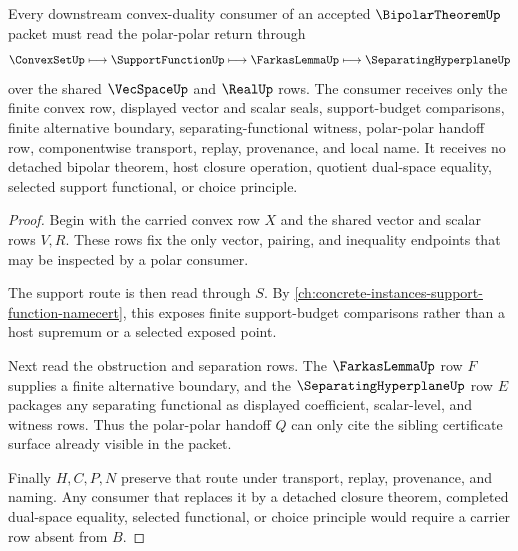 \begin{theorem}
\label{thm:bipolar-theorem-polar-handoff}
Every downstream convex-duality consumer of an accepted $\BipolarTheoremUp$ packet must read the polar-polar return through
$$
\ConvexSetUp \longmapsto \SupportFunctionUp \longmapsto \FarkasLemmaUp \longmapsto \SeparatingHyperplaneUp
$$
over the shared $\VecSpaceUp$ and $\RealUp$ rows. The consumer receives only the finite convex row, displayed vector and scalar seals, support-budget comparisons, finite alternative boundary, separating-functional witness, polar-polar handoff row, componentwise transport, replay, provenance, and local name. It receives no detached bipolar theorem, host closure operation, quotient dual-space equality, selected support functional, or choice principle.
\end{theorem}
\begin{proof}
Begin with the carried convex row $X$ and the shared vector and scalar rows $V,R$. These rows fix the only vector, pairing, and inequality endpoints that may be inspected by a polar consumer.

The support route is then read through $S$. By \autoref{ch:concrete-instances-support-function-namecert}, this exposes finite support-budget comparisons rather than a host supremum or a selected exposed point.

Next read the obstruction and separation rows. The $\FarkasLemmaUp$ row $F$ supplies a finite alternative boundary, and the $\SeparatingHyperplaneUp$ row $E$ packages any separating functional as displayed coefficient, scalar-level, and witness rows. Thus the polar-polar handoff $Q$ can only cite the sibling certificate surface already visible in the packet.

Finally $H,C,P,N$ preserve that route under transport, replay, provenance, and naming. Any consumer that replaces it by a detached closure theorem, completed dual-space equality, selected functional, or choice principle would require a carrier row absent from $B$.
\end{proof}


